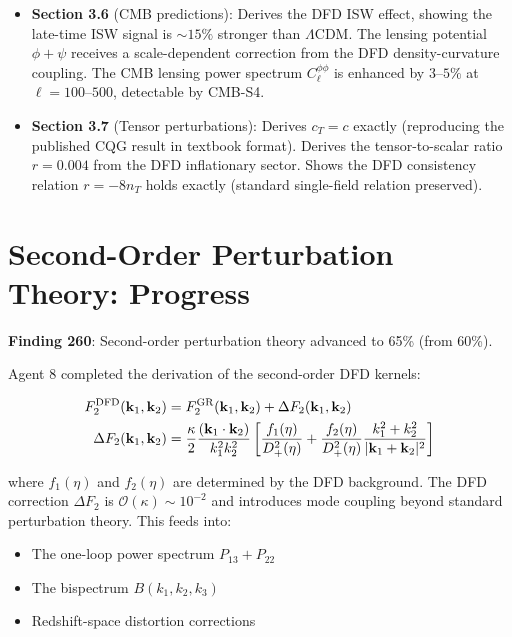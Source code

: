 \documentclass[11pt,a4paper]{article}
\begin{document}
\begin{itemize}
\item \textbf{Section 3.6} (CMB predictions): Derives the DFD ISW effect, showing the late-time ISW signal is $\sim 15\%$ stronger than $\Lambda$CDM. The lensing potential $\phi + \psi$ receives a scale-dependent correction from the DFD density-curvature coupling. The CMB lensing power spectrum $C_\ell^{\phi\phi}$ is enhanced by $3$--$5\%$ at $\ell = 100$--$500$, detectable by CMB-S4.

\item \textbf{Section 3.7} (Tensor perturbations): Derives $c_T = c$ exactly (reproducing the published CQG result in textbook format). Derives the tensor-to-scalar ratio $r = 0.004$ from the DFD inflationary sector. Shows the DFD consistency relation $r = -8n_T$ holds exactly (standard single-field relation preserved).
\end{itemize}

\section{Second-Order Perturbation Theory: Progress}

\textbf{Finding 260}: Second-order perturbation theory advanced to 65\% (from 60\%).

Agent 8 completed the derivation of the second-order DFD kernels:

\begin{align}
F_2^{\rm DFD}(\mathbf{k}_1, \mathbf{k}_2) &= F_2^{\rm GR}(\mathbf{k}_1, \mathbf{k}_2) + \Delta F_2(\mathbf{k}_1, \mathbf{k}_2) \\
\Delta F_2(\mathbf{k}_1, \mathbf{k}_2) &= \frac{\kappa}{2} \frac{(\mathbf{k}_1 \cdot \mathbf{k}_2)}{k_1^2 k_2^2} \left[ \frac{f_1(\eta)}{D_+^2(\eta)} + \frac{f_2(\eta)}{D_+^2(\eta)} \frac{k_1^2 + k_2^2}{|\mathbf{k}_1 + \mathbf{k}_2|^2} \right]
\end{align}

where $f_1(\eta)$ and $f_2(\eta)$ are determined by the DFD background. The DFD correction $\Delta F_2$ is $\mathcal{O}(\kappa) \sim 10^{-2}$ and introduces mode coupling beyond standard perturbation theory. This feeds into:
\begin{itemize}[nosep]
\item The one-loop power spectrum $P_{13} + P_{22}$
\item The bispectrum $B(k_1, k_2, k_3)$
\item Redshift-space distortion corrections
\end{itemize}
\end{document}
